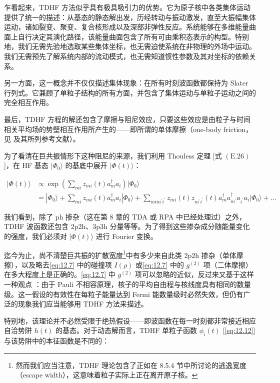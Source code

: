 乍看起来，TDHF 方法似乎具有极具吸引力的优势。它为原子核中各类集体运动提供了统一的描述：从基态的静态解出发，历经转动与振动激发，直至大振幅集体运动，诸如裂变、聚变、复合核形成以及深部非弹性反应。系统能够在多维能量曲面上自行决定其演化路径，该能量曲面包含了所有可由乘积态表示的构型。特别地，我们无需先验地选取某些集体坐标，也无需迫使系统在非物理的外场中运动。我们无需预先了解系统内部的流动模式，也无需知道惯性参数及其对坐标的依赖关系。

另一方面，这一概念并不仅仅描述集体现象：在所有时刻波函数都保持为 Slater 行列式。它兼顾了单粒子结构的所有方面，并包含了集体运动与单粒子运动之间的完全相互作用。

最后，TDHF 方程的解还包含了摩擦与阻尼效应，只要这些效应是由粒子与时间相关平均场的势壁相互作用所产生的——即所谓的单体摩擦（one-body
friction，见 \cite{BBN78} 及其所列参考文献）。

为了看清在巨共振情形下这种阻尼的来源，我们利用 Thouless 定理 {[}式 $(\text{E}.26)${]}，在 HF
基态 $|\Phi_{0}\rangle$ 的基底中展开 $|\Phi(t)\rangle$：

\begin{align}
|\Phi(t)\rangle & \propto\exp\left(\sum_{mi}z_{mi}(t)a^{\dagger}_{m}a_{i}\right)|\Phi_{0}\rangle\nonumber \\
 & =|\Phi_{0}\rangle+\sum_{mi}z_{mi}(t)a^{\dagger}_{m}a_{i}|\Phi_{0}\rangle+\sum_{mim^{\prime}i^{\prime}}z_{mi}(t)z_{m^{\prime}i^{\prime}}(t)a^{\dagger}_{m}a^{\dagger}_{m^{\prime}}a_{i^{\prime}}a_{i}|\Phi_{0}\rangle+\dots\label{eq:12.38}
\end{align}

我们看到，除了 ph 掺杂（这在第 8 章的 TDA 或 RPA 中已经处理过）之外，TDHF 波函数还包含 2p2h、3p3h 分量等等。为了得到这些掺杂成分随能量变化的强度，我们必须对
$|\Phi(t)\rangle$ 进行 Fourier 变换。

迄今为止，尚不清楚巨共振的扩散宽度\footnote{然而我们应当注意，TDHF 理论包含了正如在 8.5.4 节中所讨论的逃逸宽度（escape width），这意味着粒子实际上正在离开原子核。}中有多少来自此类
2p2h 掺杂（单体摩擦），以及略去\ref{eq:12.7} 中的碰撞项 $I(\rho)$ 或\ref{eq:12.7}
中的 $g^{(2)}$ 项（二体摩擦）在多大程度上是正确的。\ref{eq:12.7} 中 $g^{(2)}$ 项可以忽略的近似，反过来又基于这样一种观点
\cite{KK68}：由于 Pauli 不相容原理，核子的平均自由程与核线度具有相同的数量级。这一假设的有效性在每粒子能量达到
Fermi 能数量级时必然失效，但仍有广泛的现象我们应当能够用 TDHF 方法来描述。

特别地，该理论并不必然受限于绝热假设——即波函数在每一时刻都非常接近相应自洽势阱 $h(t)$ 的基态。对于动态解而言，TDHF
单粒子函数 $\phi_{i}(t)$ {[}\ref{eq:12.12}{]} 与该势阱中的本征函数是不同的：

